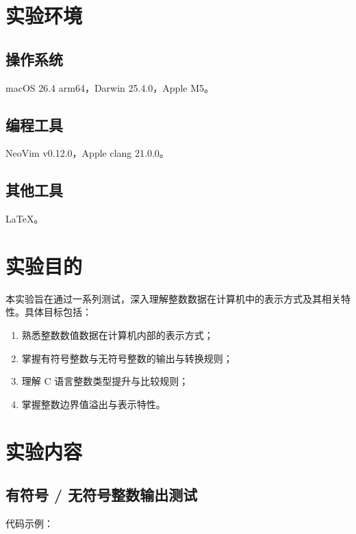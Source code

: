\documentclass[12pt, a4paper]{academics}
\begin{document}
\makeacademicscover

\section{实验环境}

\subsection{操作系统}

macOS 26.4 arm64，Darwin 25.4.0，Apple M5。

\subsection{编程工具}

NeoVim v0.12.0，Apple clang 21.0.0。

\subsection{其他工具}

\LaTeX{}。

\section{实验目的}

本实验旨在通过一系列测试，深入理解整数数据在计算机中的表示方式及其相关特性。具体目标包括：

\begin{enumerate}
    \item 熟悉整数数值数据在计算机内部的表示方式；
    \item 掌握有符号整数与无符号整数的输出与转换规则；
    \item 理解 C 语言整数类型提升与比较规则；
    \item 掌握整数边界值溢出与表示特性。
\end{enumerate}

\section{实验内容}

\subsection{有符号 / 无符号整数输出测试}

代码示例：

\inputminted{c}{../src/integer.c}
\end{document}
